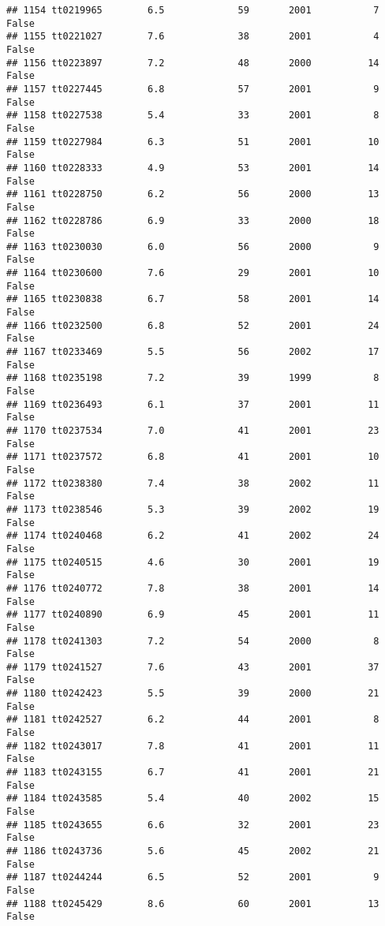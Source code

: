 \documentclass[
]{article}
\begin{document}
\begin{verbatim}
## 1154 tt0219965        6.5             59       2001           7   False
## 1155 tt0221027        7.6             38       2001           4   False
## 1156 tt0223897        7.2             48       2000          14   False
## 1157 tt0227445        6.8             57       2001           9   False
## 1158 tt0227538        5.4             33       2001           8   False
## 1159 tt0227984        6.3             51       2001          10   False
## 1160 tt0228333        4.9             53       2001          14   False
## 1161 tt0228750        6.2             56       2000          13   False
## 1162 tt0228786        6.9             33       2000          18   False
## 1163 tt0230030        6.0             56       2000           9   False
## 1164 tt0230600        7.6             29       2001          10   False
## 1165 tt0230838        6.7             58       2001          14   False
## 1166 tt0232500        6.8             52       2001          24   False
## 1167 tt0233469        5.5             56       2002          17   False
## 1168 tt0235198        7.2             39       1999           8   False
## 1169 tt0236493        6.1             37       2001          11   False
## 1170 tt0237534        7.0             41       2001          23   False
## 1171 tt0237572        6.8             41       2001          10   False
## 1172 tt0238380        7.4             38       2002          11   False
## 1173 tt0238546        5.3             39       2002          19   False
## 1174 tt0240468        6.2             41       2002          24   False
## 1175 tt0240515        4.6             30       2001          19   False
## 1176 tt0240772        7.8             38       2001          14   False
## 1177 tt0240890        6.9             45       2001          11   False
## 1178 tt0241303        7.2             54       2000           8   False
## 1179 tt0241527        7.6             43       2001          37   False
## 1180 tt0242423        5.5             39       2000          21   False
## 1181 tt0242527        6.2             44       2001           8   False
## 1182 tt0243017        7.8             41       2001          11   False
## 1183 tt0243155        6.7             41       2001          21   False
## 1184 tt0243585        5.4             40       2002          15   False
## 1185 tt0243655        6.6             32       2001          23   False
## 1186 tt0243736        5.6             45       2002          21   False
## 1187 tt0244244        6.5             52       2001           9   False
## 1188 tt0245429        8.6             60       2001          13   False

\end{verbatim}
\end{document}
